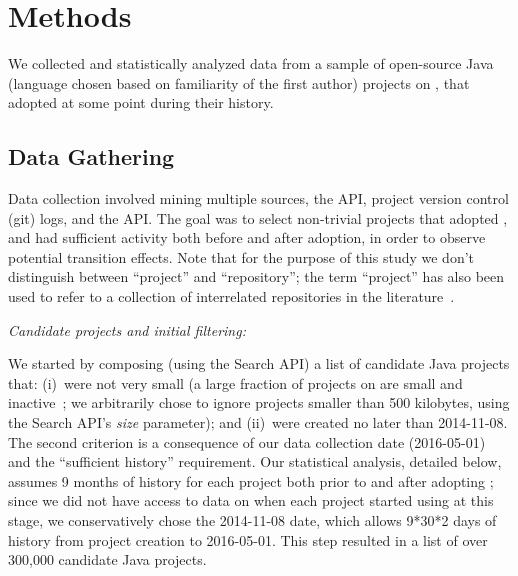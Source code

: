 
\section{Methods}
\label{sec:method}

We collected and statistically analyzed data from a sample of open-source 
Java (language chosen based on familiarity of the first author) projects on 
\GH, that adopted \Tvis at some point during their history.

\subsection{Data Gathering}

Data collection involved mining multiple sources, the \GH API, project version 
control (git) logs, and the \Tvis API.
The goal was to select non-trivial projects that adopted \Tvis, and had sufficient
activity both before and after adoption, in order to observe potential transition effects.
Note that for the purpose of this study we don't distinguish between ``project'' 
and ``repository''; the term ``project'' has also been used to refer to a collection 
of interrelated repositories in the literature~\cite{vasilescu2016sky}.

\smallskip\noindent\emph{Candidate projects and initial filtering:} 

We started by composing (using the \GH Search API) a list of candidate Java 
projects that: (i)~were not very small (a large fraction of projects on \GH are 
small and inactive~\cite{gousios2014exploratory}; we arbitrarily chose to ignore
projects smaller than 500 kilobytes, using the \GH Search API's \emph{size} 
parameter); and (ii)~were created no later than 2014-11-08. 
The second criterion is a consequence of our data collection date (2016-05-01)
and the ``sufficient history'' requirement. 
Our statistical analysis, detailed below, assumes 9 months of history for each
project both prior to and after adopting \Tvis; since we did not have access to
data on when each project started using \Tvis at this stage, we conservatively
chose the 2014-11-08 date, which allows 9*30*2 days of history from project 
creation to 2016-05-01.
This step resulted in a list of over 300,000 candidate Java projects.

